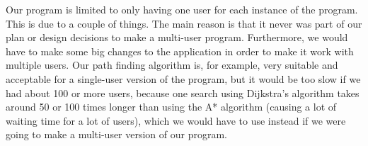 Our program is limited to only having one user for each instance of the program. This is due to a couple of things. The main reason is that it never was part of our plan or design decisions to make a multi-user program. Furthermore, we would have to make some big changes to the application in order to make it work with multiple users. Our path finding algorithm is, for example, very suitable and acceptable for a single-user version of the program, but it would be too slow if we had about 100 or more users, because one search using Dijkstra's algorithm takes around 50 or 100 times longer than using the A* algorithm (causing a lot of waiting time for a lot of users), which we would have to use instead if we were going to make a multi-user version of our program.
